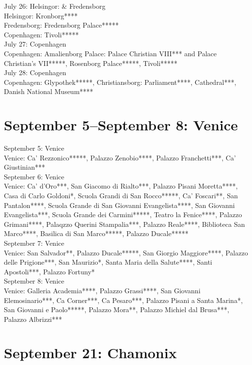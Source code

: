 July 26: Helsingor:  \& Fredensborg\\
Helsingor: Kronborg****\\
Fredensborg: Fredensborg Palace*****\\
Copenhagen: Tivoli*****\\

July 27: Copenhagen\\
Copenhagen: Amalienborg Palace: Palace Christian VIII*** and Palace Christian's VII*****, Rosenborg Palace*****, Tivoli*****\\

July 28: Copenhagen\\
Copenhagen: Glypothek*****, Christiansborg: Parliament****, Cathedral***, Danish National Museum****

\section{September 5--September 8: Venice}
\label{Venice2013}

September 5: Venice\\
Venice: Ca' Rezzonico*****, Palazzo Zenobio****, Palazzo Franchetti***, Ca' Giustinian***\\

September 6: Venice\\
Venice: Ca' d'Oro***, San Giacomo di Rialto***, Palazzo Pisani Moretta****, Casa di Carlo Goldoni*, Scuola Grandi di San Rocco*****, Ca' Foscari**, San Pantalon****, Scuola Grande di San Giovanni Evangelista****, San Giovanni Evangelista***, Scuola Grande dei Carmini*****, Teatro la Fenice****, Palazzo Grimani****, Palaqzzo Querini Stampalia***, Palazzo Reale****, Biblioteca San Marco****,  Basilica di San Marco*****, Palazzo Ducale*****\\

September 7: Venice\\
Venice: San Salvador**, Palazzo Ducale*****, San Giorgio Maggiore****, Palazzo delle Prigione***, San Maurizio*, Santa Maria della Salute****, Santi Apostoli***,  Palazzo Fortuny*\\

September 8: Venice\\
Venice: Galleria Academia****, Palazzo Grassi****, San Giovanni Elemosinario***, Ca Corner***, Ca Pesaro***, Palazzo Pisani a Santa Marina*, San Giovanni e Paolo*****, Palazzo Mora**, Palazzo Michiel dal Brusa***, Palazzo Albrizzi***

\section{September 21: Chamonix}
\label{Chamonix2013}

